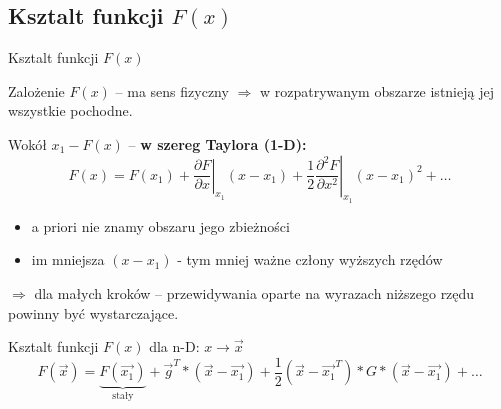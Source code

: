 \subsection{Ksztalt funkcji $ F(x) $}
  \begin{frame}{Ksztalt funkcji $ F(x) $}
    \begin{block}{Zalożenie}
      $ F(x) $ -- ma sens fizyczny $ \Rightarrow $ w rozpatrywanym
      obszarze istnieją jej wszystkie pochodne.
    \end{block}
    Wokół $ x_1 - F(x) $ -- \textbf{w szereg Taylora (1-D):}
    \begin{displaymath}
      F(x) = F(x_1) + \left. \frac{\partial F}{\partial x} \right|_{x_1}(x - x_1) +
      \left. \frac{1}{2} \frac{\partial^2 F}{\partial x^2} \right|_{x_1}(x - x_1)^2 +
      \dots
    \end{displaymath}
    \begin{itemize}
      \item a priori nie znamy obszaru jego zbieżności
      \item im mniejsza $ (x - x_1) $ - tym mniej ważne człony
      wyższych rzędów
    \end{itemize}
    $ \Rightarrow $ dla małych kroków -- przewidywania oparte
    na wyrazach niższego rzędu powinny być wystarczające.

  \end{frame}

  \begin{frame}{Ksztalt funkcji $ F(x) $}
    dla n-D: $ x \to \vec{x} $
    \begin{displaymath}
      F(\vec{x}) = \underbrace{F(\vec{x_1})}_{\text{stały}} +
      \vec{g}^T * (\vec{x} - \vec{x_1}) +
      \frac{1}{2}(\vec{x} - \vec{x_1}^T) * G * (\vec{x} - \vec{x_1}) + \dots
    \end{displaymath}

  \end{frame}
